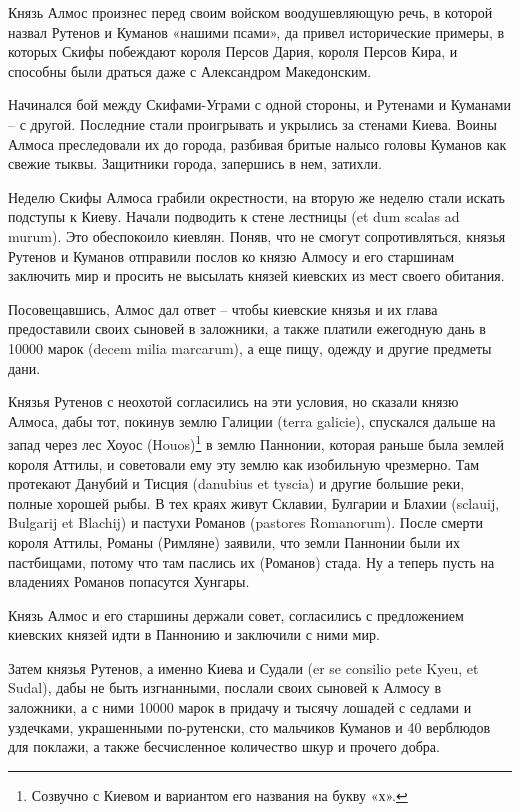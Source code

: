 Князь Алмос произнес перед своим войском воодушевляющую речь, в которой назвал Рутенов и Куманов «нашими псами», да привел исторические примеры, в которых Скифы побеждают короля Персов Дария, короля Персов Кира, и способны были драться даже с Александром Македонским.

Начинался бой между Скифами-Уграми с одной стороны, и Рутенами и Куманами – с другой. Последние стали проигрывать и укрылись за стенами Киева. Воины Алмоса преследовали их до города, разбивая бритые налысо головы Куманов как свежие тыквы. Защитники города, запершись в нем, затихли.

Неделю Скифы Алмоса грабили окрестности, на вторую же неделю стали искать подступы к Киеву. Начали подводить к стене лестницы (et dum scalas ad murum). Это обеспокоило киевлян. Поняв, что не смогут сопротивляться, князья Рутенов и Куманов отправили послов ко князю Алмосу и его старшинам заключить мир и просить не высылать князей киевских из мест своего обитания. 

Посовещавшись, Алмос дал ответ – чтобы киевские князья и их глава предоставили своих сыновей в заложники, а также платили ежегодную дань в 10000 марок (decem milia marcarum), а еще пищу, одежду и другие предметы дани.

Князья Рутенов с неохотой согласились на эти условия, но сказали князю Алмоса, дабы тот, покинув землю Галиции (terra galicie), спускался дальше на запад через лес Хоуос (Houos)\footnote{Созвучно с Киевом и вариантом его названия на букву «х».} в землю Паннонии, которая раньше была землей короля Аттилы, и советовали ему эту землю как изобильную чрезмерно. Там протекают Данубий и Тисция (danubius et tyscia) и другие большие реки, полные хорошей рыбы. В тех краях живут Склавии, Булгарии и Блахии (sclauij, Bulgarij et Blachij) и пастухи Романов (pastores Romanorum). После смерти короля Аттилы, Романы (Римляне) заявили, что земли Паннонии были их пастбищами, потому что там паслись их (Романов) стада. Ну а теперь пусть на владениях Романов попасутся Хунгары. 

Князь Алмос и его старшины держали совет,  согласились с предложением киевских князей идти в Паннонию и заключили с ними мир.

Затем князья Рутенов, а именно Киева и Судали (er se consilio pete Kyeu, et Sudal), дабы не быть изгнанными, послали своих сыновей к Алмосу в заложники, а с ними 10000 марок в придачу и тысячу лошадей с седлами и уздечками, украшенными по-рутенски, сто мальчиков Куманов и 40 верблюдов для поклажи, а также бесчисленное количество шкур и прочего добра.

